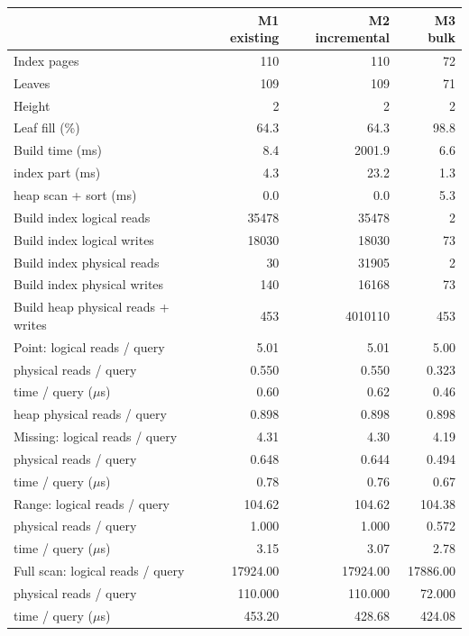 \begin{tabular}{lrrr}
\toprule
 & M1 existing & M2 incremental & M3 bulk \\
\midrule
Index pages & 110 & 110 & 72 \\
Leaves & 109 & 109 & 71 \\
Height & 2 & 2 & 2 \\
Leaf fill (\%) & 64.3 & 64.3 & 98.8 \\
\midrule
Build time (ms) & 8.4 & 2001.9 & 6.6 \\
\quad index part (ms) & 4.3 & 23.2 & 1.3 \\
\quad heap scan + sort (ms) & 0.0 & 0.0 & 5.3 \\
\midrule
Build index logical reads & 35478 & 35478 & 2 \\
Build index logical writes & 18030 & 18030 & 73 \\
Build index physical reads & 30 & 31905 & 2 \\
Build index physical writes & 140 & 16168 & 73 \\
Build heap physical reads + writes & 453 & 4010110 & 453 \\
\midrule
Point: logical reads / query & 5.01 & 5.01 & 5.00 \\
\quad physical reads / query & 0.550 & 0.550 & 0.323 \\
\quad time / query ($\mu$s) & 0.60 & 0.62 & 0.46 \\
\quad heap physical reads / query & 0.898 & 0.898 & 0.898 \\
\midrule
Missing: logical reads / query & 4.31 & 4.30 & 4.19 \\
\quad physical reads / query & 0.648 & 0.644 & 0.494 \\
\quad time / query ($\mu$s) & 0.78 & 0.76 & 0.67 \\
\midrule
Range: logical reads / query & 104.62 & 104.62 & 104.38 \\
\quad physical reads / query & 1.000 & 1.000 & 0.572 \\
\quad time / query ($\mu$s) & 3.15 & 3.07 & 2.78 \\
\midrule
Full scan: logical reads / query & 17924.00 & 17924.00 & 17886.00 \\
\quad physical reads / query & 110.000 & 110.000 & 72.000 \\
\quad time / query ($\mu$s) & 453.20 & 428.68 & 424.08 \\
\bottomrule
\end{tabular}
